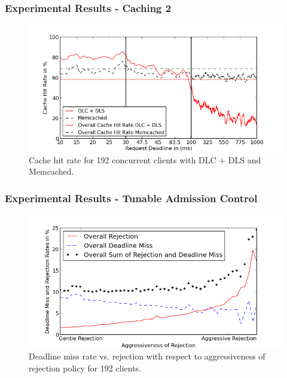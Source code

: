 \documentclass{beamer}
\begin{document}
\begin{frame}
\frametitle{Experimental Results - Caching 2}
\begin{figure}[t]
\begin{center}
\centerline{\includegraphics[scale=0.5]{img/EC2/EC2_SH_MM/cache_48.png}}
\caption{Cache hit rate for 192 concurrent clients with DLC + DLS and Memcached.}
\label{fig:cache_192_sh_mm}
\end{center}
\end{figure}
\end{frame}



\begin{frame}
\frametitle{Experimental Results - Tunable Admission Control}
\begin{figure}[t]
\begin{center}
\centerline{\includegraphics[scale=0.5]{img/EC2/Varying_ac/varying_acPerc_192.png}}
\caption{Deadline miss rate vs. rejection with respect to aggressiveness of rejection policy for 192 clients.}
\label{fig:deadline_miss_vs_rejection}
\end{center}
\end{figure}
\end{frame}
\end{document}
